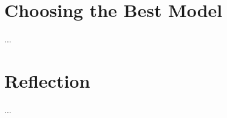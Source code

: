 \documentclass[a4paper]{article}
\begin{document}

\section{Choosing the Best Model}
...




\section{Reflection}
...





\end{document}
